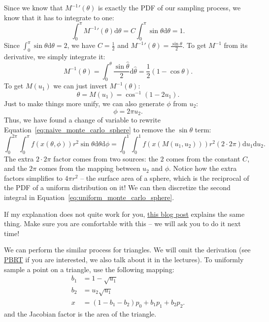 Since we know that ${M^{-1}}'(\theta)$ is exactly the PDF of our sampling process, we know that it has to integrate to one:
\begin{equation}
\int_{0}^{\pi} {M^{-1}}'(\theta) \mathrm{d}\theta = C\int_{0}^{\pi} \sin\theta \mathrm{d}\theta = 1.
\end{equation}
Since $\int_{0}^{\pi} \sin\theta \mathrm{d}\theta = 2$, we have $C = \frac{1}{2}$ and ${M^{-1}}'(\theta) = \frac{\sin\theta}{2}$. To get $M^{-1}$ from its derivative, we simply integrate it:
\begin{equation}
M^{-1}(\theta) = \int_{0}^{\theta} \frac{\sin\hat{\theta}}{2} \mathrm{d}\hat{\theta} = \frac{1}{2}\left(1 - \cos\theta\right).
\end{equation}
To get $M(u_1)$ we can just invert $M^{-1}(\theta)$:
\begin{equation}
\theta = M(u_1) = \cos^{-1}\left(1 - 2u_1\right).
\end{equation}
Just to make things more unify, we can also generate $\phi$ from $u_2$:
\begin{equation}
\phi = 2\pi u_2.
\end{equation}
Thus, we have found a change of variable to rewrite Equation~\eqref{eq:naive_monte_carlo_sphere} to remove the $\sin\theta$ term:
\begin{equation}
    \int_{0}^{2\pi}\int_{0}^{\pi} f(x(\theta, \phi)) r^2 \sin\theta \mathrm{d}\theta \mathrm{d} \phi =
    \int_{0}^{1}\int_{0}^{1} f(x(M(u_1, u_2))) r^2 (2 \cdot 2\pi) \mathrm{d}u_1 \mathrm{d}u_2.
    \label{eq:uniform_monte_carlo_sphere}
\end{equation}
The extra $2 \cdot 2\pi$ factor comes from two sources: the $2$ comes from the constant $C$, and the $2\pi$ comes from the mapping between $u_2$ and $\phi$. Notice how the extra factors simplifies to $4\pi r^2$ -- the surface area of a sphere, which is the reciprocal of the PDF of a uniform distribution on it! We can then discretize the second integral in Equation~\eqref{eq:uniform_monte_carlo_sphere}.

If my explanation does not quite work for you, \href{http://6degreesoffreedom.co/circle-random-sampling/}{this blog post} explains the same thing. Make sure you are comfortable with this -- we will ask you to do it next time!

We can perform the similar process for triangles. We will omit the derivation (see \href{https://www.pbr-book.org/3ed-2018/Monte_Carlo_Integration/2D_Sampling_with_Multidimensional_Transformations#SamplingaTriangle}{PBRT} if you are interested, we also talk about it in the lectures). To uniformly sample a point on a triangle, use the following mapping:
\begin{equation}
\begin{aligned}
b_1 &= 1 - \sqrt{u_1} \\
b_2 &= u_2 \sqrt{u_1} \\
x &= (1 - b_1 - b_2) p_0 + b_1 p_1 + b_2 p_2.
\end{aligned}
\end{equation}
and the Jacobian factor is the area of the triangle.

